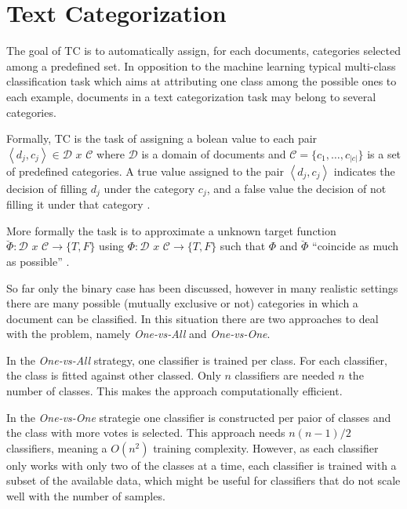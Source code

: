 
\section{Text Categorization}
\label{sec:rel_text_categorization}

The goal of \ac{TC} is to automatically assign, for each
documents, categories selected among a predefined set.
In opposition to the machine learning typical multi-class classification
task which aims at attributing one class among the possible ones to each
example, documents in a text categorization task may belong to several
categories. 


Formally,  \ac{TC} is the  task of  assigning a bolean value to each pair 
$\left\langle d_{j},c_{j}\right\rangle \in\mathcal{D}\,\, x\,\mathcal{\, C}$
where  $\mathcal{D}$  is a domain of documents and
$\mathcal{C}=\{c_{1},\ldots,c_{|c|}\}$ is a set of predefined categories. A
true value assigned to the pair $\left\langle d_{j},c_{j}\right\rangle $
indicates the decision of filling  $d_{j}$ under the category  $c_{j}$, and
a false value the decision of not filling it under that category \cite{Sebastiani02}. 

More formally the task is to approximate a unknown target function 
 $\breve{\Phi}:\mathcal{D}\,\, x\,\mathcal{\, C}\rightarrow\{T,F\}$  using 
 $\Phi:\mathcal{D}\,\, x\,\mathcal{\, C}\rightarrow\{T,F\}$  such that 
 $\Phi$ and  $\breve{\Phi}$ ``coincide as much as possible'' \cite{Sebastiani02}. 

So far only the binary case has been discussed, however in many realistic
settings there are many possible (mutually exclusive or not) categories in
which a document can be classified. In this situation there are two approaches
to deal with the problem, namely \textit{One-vs-All} and \textit{One-vs-One}. 

In the \textit{One-vs-All} strategy, one classifier is trained per class. For
each classifier, the class is fitted against other classed. Only $n$ 
classifiers are needed $n$ the number of classes. This makes the approach computationally efficient.

In the \textit{One-vs-One} strategie  one classifier is constructed per paior
of classes and the class with more votes is selected. This approach needs
$n(n-1)/2$ classifiers, meaning a $O(n^2)$ training complexity. However,  as
each classifier only works with only two of the classes at a time, each
classifier is trained with a subset of the available data, which might be useful for
classifiers that do not scale well with the number of samples.


